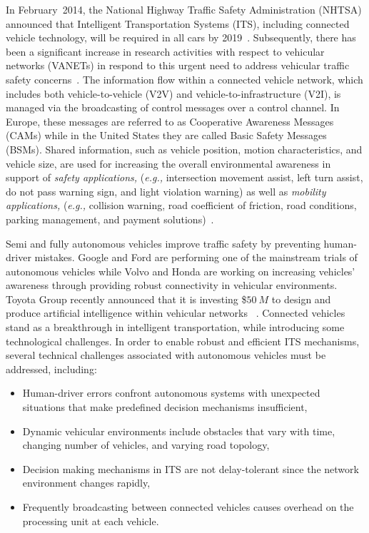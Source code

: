 \documentclass[journal, 11pt]{IEEEtran}
\begin{document}
In February~2014, the National Highway Traffic Safety Administration (NHTSA)
announced that Intelligent Transportation Systems (ITS), including connected
vehicle technology, will be required in all cars by 2019~\cite{factsheet}.
Subsequently, there has been a significant increase in research activities with
respect to vehicular networks (VANETs) in respond to this urgent need to
address vehicular traffic safety concerns~\cite{ntsb}. The information flow
within a connected vehicle network, which includes both vehicle-to-vehicle (V2V)
and vehicle-to-infrastructure (V2I), is managed via the broadcasting of control
messages over a control channel. In Europe, these messages are referred to as
Cooperative Awareness Messages (CAMs) while in the United States they are called
Basic Safety Messages (BSMs). Shared information, such as vehicle position,
motion characteristics, and vehicle size, are used for increasing the overall
environmental awareness in support of \textit{safety applications,}
(\textit{e.g.,} intersection movement assist, left turn assist, do not pass
warning sign, and light violation warning) as well as \textit{mobility
applications,} (\textit{e.g.,} collision warning, road coefficient of friction,
road conditions, parking management, and payment
solutions)~\cite{hardingNHTSA14}.

Semi and fully autonomous vehicles improve traffic safety by preventing
human-driver mistakes. Google and Ford are performing one of the mainstream
trials of autonomous vehicles while Volvo and Honda are working on increasing
vehicles' awareness through providing robust connectivity in vehicular
environments. Toyota Group recently announced that it is investing \$$50~M$ to
design and produce artificial intelligence within vehicular networks
~\cite{toyota50M}. Connected vehicles stand as a breakthrough in intelligent
transportation, while introducing some technological challenges. In order to
enable robust and efficient ITS mechanisms, several technical challenges
associated with autonomous vehicles must be addressed, including:

\begin{itemize}
\item Human-driver errors confront autonomous systems with unexpected
situations that make predefined decision mechanisms insufficient,
\item Dynamic vehicular environments include obstacles that vary with time,
changing number of vehicles, and varying road topology,
\item Decision making mechanisms in ITS are not delay-tolerant since the network
environment changes rapidly,
\item Frequently broadcasting between connected vehicles causes overhead on the
processing unit at each vehicle.
\end{itemize}
\end{document}
